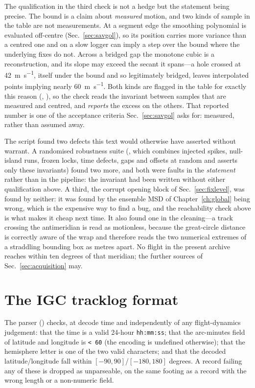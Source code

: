 \begin{revblock}
The qualification in the third check is not a hedge but the statement being precise.
The bound is a claim about \emph{measured} motion, and two kinds of sample in the table
are not measurements. At a segment edge the smoothing polynomial is evaluated off-centre
(Sec.~\ref{sec:savgol}), so its position carries more variance than a centred one and
on a slow logger can imply a step over the bound where the underlying fixes do not.
Across a bridged gap the monotone cubic is a reconstruction, and its slope may exceed
the secant it spans---a hole crossed at \SI{42}{\metre\per\second}, itself under the
bound and so legitimately bridged, leaves interpolated points implying nearly
\SI{60}{\metre\per\second}. Both kinds are flagged in the table for exactly this
reason (, ), so the check reads the invariant between
samples that are measured and centred, and \emph{reports} the excess on the others.
That reported number is one of the acceptance criteria Sec.~\ref{sec:savgol} asks for:
measured, rather than assumed away.

The script found two defects this text would otherwise have asserted without warrant.
A randomised robustness suite (, which combines
injected spikes, null-island runs, frozen locks, time defects, gaps and offsets at
random and asserts only these invariants) found two more, and both were faults in the
\emph{statement} rather than in the pipeline: the invariant had been written without
either qualification above. A third, the corrupt opening block of
Sec.~\ref{sec:fixlevel}, was found by neither: it was found by the ensemble MSD of
Chapter~\ref{ch:global} being wrong, which is the expensive way to find a bug, and
the reachability check above is what makes it cheap next time. It also found one in the
cleaning---a track crossing the
antimeridian is read as motionless, because the great-circle distance is correctly aware
of the wrap and therefore reads the two numerical extremes of a straddling bounding box
as metres apart. No flight in the present archive reaches within ten degrees of that
meridian; the further sources of Sec.~\ref{sec:acquisition} may.
\end{revblock}

\section{The IGC tracklog format}
\label{impl:igcformat}
The parser () checks, at decode time and
independently of any flight-dynamics judgement: that the time is a valid 24-hour
\texttt{hh:mm:ss}; that the arc-minutes field of latitude and longitude is
\texttt{<\,60} (the  encoding is undefined otherwise); that the
hemisphere letter is one of the two valid characters; and that the decoded
latitude/longitude fall within $[-90,90]$/$[-180,180]$ degrees. A record failing any of
these is dropped as unparseable, on the same footing as a record with the wrong length or
a non-numeric field. 


